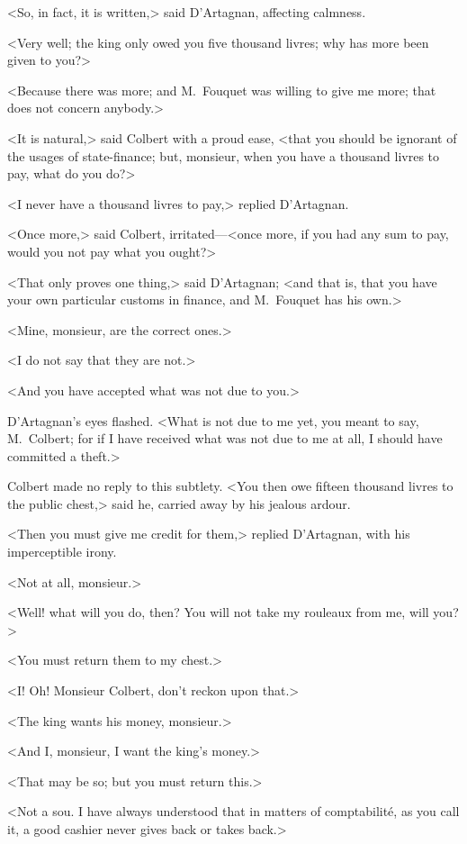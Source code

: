 <So, in fact, it is written,> said D'Artagnan, affecting calmness.

<Very well; the king only owed you five thousand livres; why has more been given to you?>

<Because there was more; and M.~Fouquet was willing to give me more; that does not concern anybody.>

<It is natural,> said Colbert with a proud ease, <that you should be ignorant of the usages of state-finance; but, monsieur, when you have a thousand livres to pay, what do you do?>

<I never have a thousand livres to pay,> replied D'Artagnan.

<Once more,> said Colbert, irritated—<once more, if you had any sum to pay, would you not pay what you ought?>

<That only proves one thing,> said D'Artagnan; <and that is, that you have your own particular customs in finance, and M.~Fouquet has his own.>

<Mine, monsieur, are the correct ones.>

<I do not say that they are not.>

<And you have accepted what was not due to you.>

D'Artagnan's eyes flashed. <What is not due to me yet, you meant to say, M.~Colbert; for if I have received what was not due to me at all, I should have committed a theft.>

Colbert made no reply to this subtlety. <You then owe fifteen thousand livres to the public chest,> said he, carried away by his jealous ardour.

<Then you must give me credit for them,> replied D'Artagnan, with his imperceptible irony.

<Not at all, monsieur.>

<Well! what will you do, then? You will not take my rouleaux from me, will you?>

<You must return them to my chest.>

<I\@! Oh! Monsieur Colbert, don't reckon upon that.>

<The king wants his money, monsieur.>

<And I, monsieur, I want the king's money.>

<That may be so; but you must return this.>

<Not a sou. I have always understood that in matters of comptabilité, as you call it, a good cashier never gives back or takes back.>

